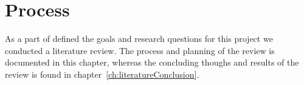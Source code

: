 \chapter{Process}\label{ch:literatureProcess}
As a part of defined the goals and research questions for this project we conducted a literature review. The process and planning of the review is documented in this chapter, whereas the concluding thoughs and results of the review is found in chapter~\ref{ch:literatureConclusion}. 

	
